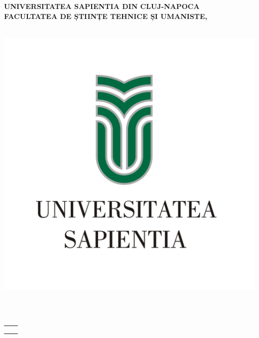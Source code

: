 
\begin{titlepage}
	\begin{center}
	
		\large{\bfseries UNIVERSITATEA SAPIENTIA DIN CLUJ-NAPOCA} \\
		\large{\bfseries FACULTATEA DE ȘTIINȚE TEHNICE ȘI UMANISTE,} \\
		
		\large{\bfseries \szakRO} \\[2.5cm]
		
			\begin{center}
			\includegraphics[scale=2]{images/sapientia-ro}
		\end{center}
		
		\vspace{0.1cm}
		
	
		
		\Large{\Large \cimRO}\\[0.8cm]
		\vspace{0.5cm}
		\textsc{\Large \bfseries \dolgozattipusRO}\\[2.5cm]
		
		{
			\large
		
			\renewcommand{\arraystretch}{0.85}
			\begin{tabular}{cc}
				 \makebox[6.5cm]{Coordonator științific:} & \makebox[6.5cm]{Absolvent:} \\ \noalign{\smallskip}
				 \makebox[6.5cm]{\temavezetoRo} & \makebox[6.5cm]{\szerzo} \\
				 {\temavezetoAfokozatRo}
			\end{tabular}
		}
		
		\vfill
		{\large \bfseries \ev}
	\end{center}
\end{titlepage}